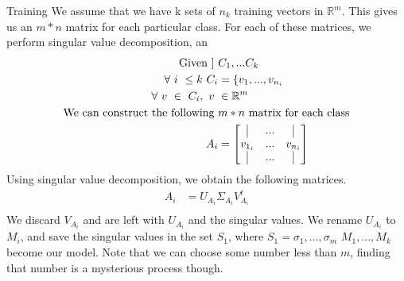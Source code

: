 \documentclass[11pt]{amsart}
\theoremstyle{definition}  %
\begin{document}
\begin{section}{Training}
We assume that we have k sets of $n_k$ training vectors in $\mathbb{R}^{m}$. This gives us an $m*n$ matrix for each particular class.
For each of these matrices, we perform singular value decomposition, an
	\begin{align*}
		\text{Given }]\ &C_1,...C_k\\
		\forall\ i\ \le k\ C_i &= \{v_1,...,v_{n_i}\\
		\forall\ v\ \in\ C_i,\ v\ &\in \mathbb{R}^{m}\\
		\text{We can construct the following}\ &m*n\ \text{matrix for each class}\\
		A_i &= \begin{bmatrix}
			\vline &...& \vline \\
			v_{1_i}&...& v_{n_i}\\
			\vline &...& \vline \\
		\end{bmatrix}\\
	\end{align*}
	Using singular value decomposition, we obtain the following matrices.
	\begin{align*}
		A_i &= U_{A_i}\Sigma_{A_i}V^t_{A_i}\\
	\end{align*}
	We discard $V_{A_i}$ and are left with $U_{A_i}$ and the singular values. We rename $U_{A_i}$ to $M_i$, and save
	the singular values in the set $S_1$, where $S_1={\sigma_1,...,\sigma_m}$
	$M_1,...,M_k$ become our model. Note that we can choose some number less than $m$, finding that number
	is a mysterious process though.
\end{section}
\end{document}
